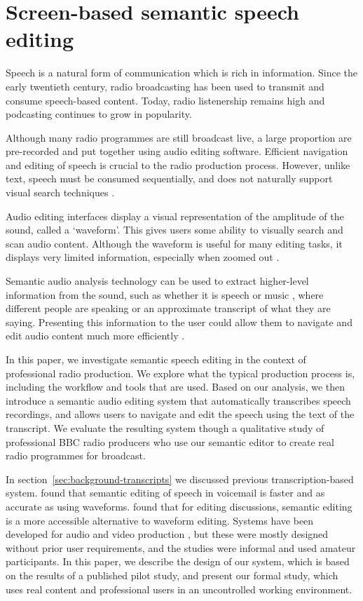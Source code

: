 \chapter{Screen-based semantic speech editing}\label{chp:screen}

Speech is a natural form of communication which is rich in information. Since the early twentieth century, radio
broadcasting has been used to transmit and consume speech-based content. Today, radio listenership remains high and
podcasting continues to grow in popularity. 

Although many radio programmes are still broadcast live, a large proportion are pre-recorded and put together using
audio editing software. Efficient navigation and editing of speech is crucial to the radio production process.
However, unlike text, speech must be consumed sequentially, and does not naturally support visual search techniques
\citep{Wolfe2004}. 

Audio editing interfaces display a visual representation of the amplitude of the sound, called a `waveform'. This gives
users some ability to visually search and scan audio content. Although the waveform is useful for many editing tasks,
it displays very limited information, especially when zoomed out \citep{Loviscach2011}.

Semantic audio analysis technology can be used to extract higher-level information from the sound, such as whether it
is speech or music \citep{Panagiotakis2005}, where different people are speaking \citep{AngueraMiro2012} or an
approximate transcript of what they are saying.  Presenting this information to the user could allow them to navigate
and edit audio content much more efficiently \citep{Whittaker2004}.

In this paper, we investigate semantic speech editing in the context of professional radio production. We explore what
the typical production process is, including the workflow and tools that are used. Based on our analysis, we then
introduce a semantic audio editing system that automatically transcribes speech recordings, and allows users to
navigate and edit the speech using the text of the transcript.  We evaluate the resulting system though a qualitative
study of professional BBC radio producers who use our semantic editor to create real radio programmes for broadcast.


In section~\ref{sec:background-transcripts} we discussed previous transcription-based system.
\citet{Whittaker2004} found that semantic editing of speech in voicemail is faster and
as accurate as using waveforms.  \citet{Sivaraman2016} found that for editing discussions, semantic editing is a more
accessible alternative to waveform editing. Systems have been developed for audio and video production
\citep{Casares2002,Berthouzoz2012,Rubin2013}, but these were mostly designed without prior user requirements, and the
studies were informal and used amateur participants. In this paper, we describe the design of our system, which is
based on the results of a published pilot study, and present our formal study, which uses real content and professional
users in an uncontrolled working environment.

